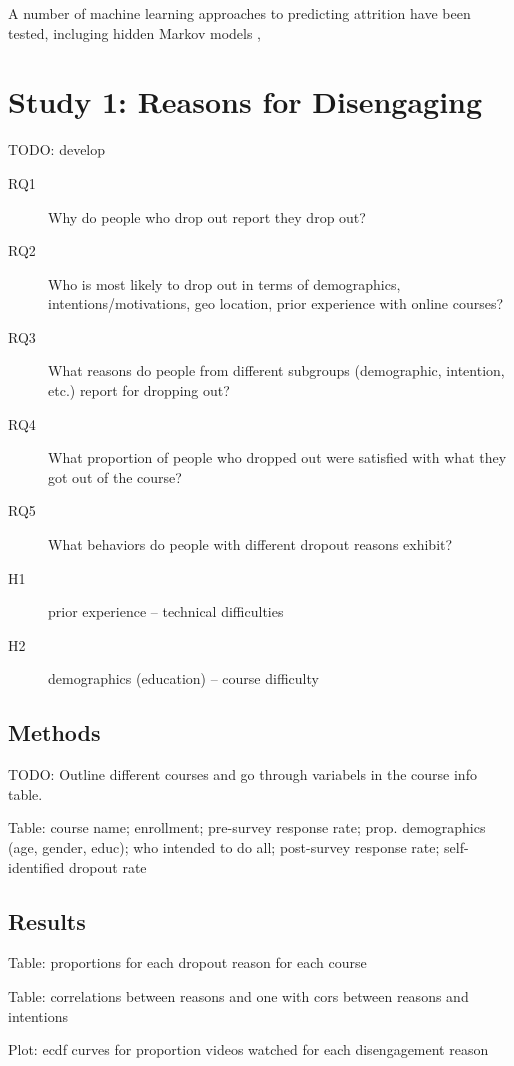 \documentclass{sigchi}\usepackage[]{graphicx}\usepackage[]{color}
\begin{document}
A number of machine learning approaches to predicting attrition have been tested, incluging hidden Markov models \cite{balakrishnan2013predicting}, 


\section{Study 1: Reasons for Disengaging}

TODO: develop

\begin{description}
  \item[RQ1] Why do people who drop out report they drop out?
  \item[RQ2] Who is most likely to drop out in terms of demographics, intentions/motivations, geo location, prior experience with online courses?
  \item[RQ3] What reasons do people from different subgroups (demographic, intention, etc.) report for dropping out?
  \item[RQ4] What proportion of people who dropped out were satisfied with what they got out of the course?
  \item[RQ5] What behaviors do people with different dropout reasons exhibit?
  \item[H1] prior experience -- technical difficulties
  \item[H2] demographics (education) -- course difficulty
\end{description}


\subsection{Methods}

TODO: Outline different courses and go through variabels in the course info table.

Table:  course name; enrollment; pre-survey response rate; prop. demographics (age, gender, educ); who intended to do all; post-survey response rate; self-identified dropout rate


\subsection{Results}

Table: proportions for each dropout reason for each course

Table: correlations between reasons and one with cors between reasons and intentions

Plot: ecdf curves for proportion videos watched for each disengagement reason
\end{document}
